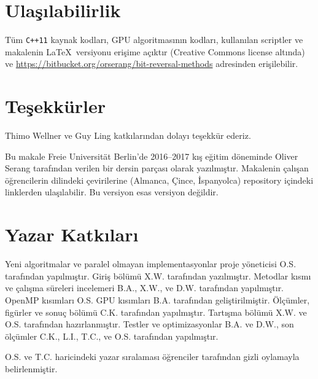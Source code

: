 \documentclass[10pt]{article}
\begin{document}
\section*{Ula\c{s}{\i}labilirlik}
T\"{u}m {\tt C++11} kaynak kodlar{\i}, GPU algoritmas{\i}n{\i}n kodlar{\i}, 
kullan{\i}lan scriptler ve makalenin \LaTeX\ versiyonu eri\c{s}ime a\c{c}{\i}kt{\i}r
(Creative Commons license alt{\i}nda) ve
\url{https://bitbucket.org/orserang/bit-reversal-methods} adresinden eri\c{s}ilebilir.\newline

\section*{Te\c{s}ekk\"{u}rler}

Thimo Wellner ve Guy Ling katk{\i}lar{\i}ndan dolay{\i} te\c{s}ekk\"{u}r ederiz.\newline 

\noindent 
Bu makale Freie Universit\"at Berlin'de 2016--2017 
k{\i}\c{s} e\u{g}itim d\"{o}neminde Oliver Serang
taraf{\i}ndan verilen bir dersin par\c{c}as{\i} olarak yaz{\i}lm{\i}\c{s}t{\i}r.
Makalenin \c{c}al{\i}\c{s}an \"{o}\u{g}rencilerin dilindeki \c{c}evirilerine (Almanca, \c{C}ince, \.{I}spanyolca)
repository i\c{c}indeki linklerden ula\c{s}{\i}labilir. Bu versiyon esas versiyon de\u{g}ildir.

\section*{Yazar Katk{\i}lar{\i}}
Yeni algoritmalar ve paralel olmayan implementasyonlar 
proje y\"{o}neticisi O.S. taraf{\i}ndan yap{\i}lm{\i}\c{s}t{\i}r. Giri\c{s} b\"{o}l\"{u}m\"{u} X.W.
taraf{\i}ndan yaz{\i}lm{\i}\c{s}t{\i}r. Metodlar k{\i}sm{\i} ve \c{c}al{\i}\c{s}ma s\"{u}releri incelemeri
B.A., X.W., ve D.W. taraf{\i}ndan yap{\i}lm{\i}\c{s}t{\i}r. OpenMP k{\i}s{\i}mlar{\i} O.S. GPU
k{\i}s{\i}mlar{\i} B.A. taraf{\i}ndan geli\c{s}tirilmi\c{s}tir. \"{O}l\c{c}\"{u}mler, fig\"{u}rler ve sonu\c{c} 
b\"{o}l\"{u}m\"{u} C.K. taraf{\i}ndan yap{\i}lm{\i}\c{s}t{\i}r. Tart{\i}\c{s}ma b\"{o}l\"{u}m\"{u} X.W. ve O.S. taraf{\i}ndan
haz{\i}rlanm{\i}\c{s}t{\i}r. Testler ve optimizasyonlar B.A. ve D.W., son \"{o}l\c{c}\"{u}mler 
C.K., L.I., T.C., ve O.S. taraf{\i}ndan yap{\i}lm{\i}\c{s}t{\i}r.\newline

\noindent O.S. ve T.C. haricindeki yazar s{\i}ralamas{\i} \"{o}\u{g}renciler taraf{\i}ndan
gizli oylamayla belirlenmi\c{s}tir.



\end{document}
